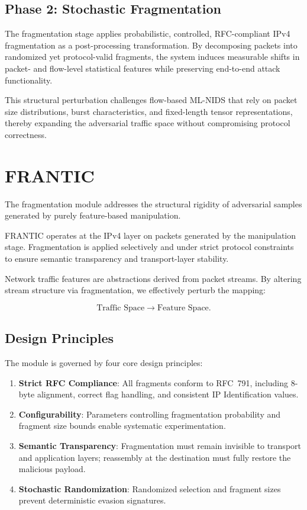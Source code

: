 \subsection{Phase 2: Stochastic Fragmentation}

The fragmentation stage applies probabilistic, controlled, RFC-compliant IPv4 fragmentation as a post-processing transformation. By decomposing packets into randomized yet protocol-valid fragments, the system induces measurable shifts in packet- and flow-level statistical features while preserving end-to-end attack functionality.

This structural perturbation challenges flow-based ML-NIDS that rely on packet size distributions, burst characteristics, and fixed-length tensor representations, thereby expanding the adversarial traffic space without compromising protocol correctness.

\section{FRANTIC}
\label{sec:fragmentation_module}
The fragmentation module addresses the structural rigidity of adversarial samples generated by purely feature-based manipulation.

FRANTIC operates at the IPv4 layer on packets generated by the manipulation stage. Fragmentation is applied selectively and under strict protocol constraints to ensure semantic transparency and transport-layer stability.

Network traffic features are abstractions derived from packet streams. By altering stream structure via fragmentation, we effectively perturb the mapping:

\[
\text{Traffic Space} \longrightarrow \text{Feature Space}.
\]

\subsection{Design Principles}

The module is governed by four core design principles:

\begin{enumerate}
    \item \textbf{Strict RFC Compliance}: All fragments conform to RFC~791, including 8-byte alignment, correct flag handling, and consistent IP Identification values.
    \item \textbf{Configurability}: Parameters controlling fragmentation probability and fragment size bounds enable systematic experimentation.
    \item \textbf{Semantic Transparency}: Fragmentation must remain invisible to transport and application layers; reassembly at the destination must fully restore the malicious payload.
    \item \textbf{Stochastic Randomization}: Randomized selection and fragment sizes prevent deterministic evasion signatures.
\end{enumerate}

